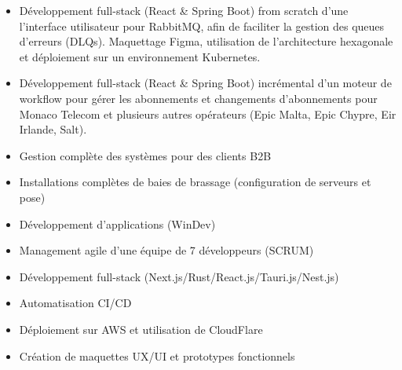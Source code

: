 \documentclass[10pt,a4paper,ragged2e,withhyper]{altacv}
\begin{document}

\makecvheader


\begin{paracol}{2}


\begin{itemize}
    \item Développement full-stack (React \& Spring Boot) from scratch d'une l'interface utilisateur pour RabbitMQ, afin de faciliter la gestion des queues d'erreurs (DLQs). Maquettage Figma, utilisation de l'architecture hexagonale et déploiement sur un environnement Kubernetes.
    \item Développement full-stack (React \& Spring Boot) incrémental d'un moteur de workflow pour gérer les abonnements et changements d’abonnements pour Monaco Telecom et plusieurs autres opérateurs (Epic Malta, Epic Chypre, Eir Irlande, Salt).
\end{itemize}

\divider

\begin{itemize}
    \item Gestion complète des systèmes pour des clients B2B
    \item Installations complètes de baies de brassage (configuration de serveurs et pose)
    \item Développement d'applications (WinDev)
\end{itemize}


\begin{itemize}
    \item Management agile d'une équipe de 7 développeurs (SCRUM)
    \item Développement full-stack (Next.js/Rust/React.js/Tauri.js/Nest.js)
    \item Automatisation CI/CD
    \item Déploiement sur AWS et utilisation de CloudFlare
    \item Création de maquettes UX/UI et prototypes fonctionnels
\end{itemize}


\end{paracol}
\end{document}
